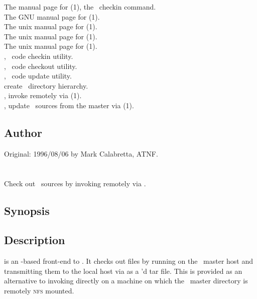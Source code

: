 The manual page for (1), the \rcs\ checkin command.\\
The GNU manual page for (1).\\
The unix manual page for (1).\\
The unix manual page for (1).\\
The unix manual page for (1).\\
, \aipspp\ code checkin utility.\\
, \aipspp\ code checkout utility.\\
, \aipspp\ code update utility.\\
 create \aipspp\ directory hierarchy.\\
, invoke  remotely via (1).\\
, update \aipspp\ sources from the master via (1).
 
\subsection*{Author}
 
Original: 1996/08/06 by Mark Calabretta, ATNF.

 
\newpage
\section{}
\label{rao}
 
Check out \aipspp\ sources by invoking  remotely via .

\subsection*{Synopsis}
 
\begin{synopsis}
\end{synopsis}
 
\subsection*{Description}
 
 is an -based front-end to .  It checks out
files by running  on the \aipspp\ master host and transmitting
them to the local host via  as a 'd tar file.  This
is provided as an alternative to invoking  directly on a machine
on which the \aipspp\ master directory is remotely \textsc{nfs} mounted.
 
